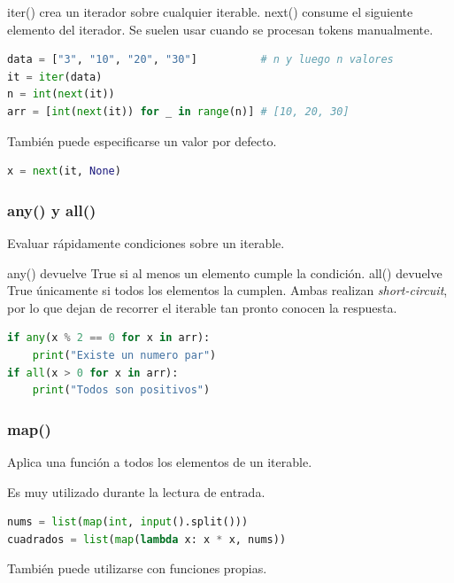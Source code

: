 iter() crea un iterador sobre cualquier iterable.
next() consume el siguiente elemento del iterador.
Se suelen usar cuando se procesan tokens manualmente.

\begin{lstlisting}[language=Python]
data = ["3", "10", "20", "30"]          # n y luego n valores
it = iter(data)
n = int(next(it))
arr = [int(next(it)) for _ in range(n)] # [10, 20, 30]
\end{lstlisting}

También puede especificarse un valor por defecto.

\begin{lstlisting}[language=Python]
x = next(it, None)
\end{lstlisting}

\vspace{0.3cm}

\subsubsection{any() y all()}

Evaluar rápidamente condiciones sobre un iterable.

any() devuelve True si al menos un elemento cumple la condición.
all() devuelve True únicamente si todos los elementos la cumplen.
Ambas realizan \textit{short-circuit}, por lo que dejan de recorrer el iterable tan pronto conocen la respuesta.

\begin{lstlisting}[language=Python]
if any(x % 2 == 0 for x in arr):
    print("Existe un numero par")
if all(x > 0 for x in arr):
    print("Todos son positivos")
\end{lstlisting}

\vspace{0.3cm}

\subsubsection{map()}

Aplica una función a todos los elementos de un iterable.

Es muy utilizado durante la lectura de entrada.

\begin{lstlisting}[language=Python]
nums = list(map(int, input().split()))
cuadrados = list(map(lambda x: x * x, nums))
\end{lstlisting}

También puede utilizarse con funciones propias.

